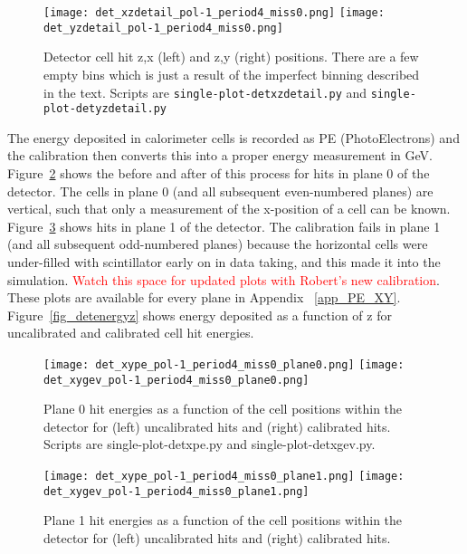  \begin{figure}	   
 \centering
  \texttt{[image: det\_xzdetail\_pol-1\_period4\_miss0.png]}
   \texttt{[image: det\_yzdetail\_pol-1\_period4\_miss0.png]}
  \caption{Detector cell hit z,x (left) and z,y (right) positions. There are a few empty bins which is just a result of the imperfect binning described in the text.
  Scripts are \texttt{single-plot-detxzdetail.py} and \texttt{single-plot-detyzdetail.py}  }			
   \label{fig_detxz}
  \end{figure}
  
  

\noindent
The energy deposited in calorimeter cells is recorded as PE (PhotoElectrons) and the calibration then converts this into a proper energy measurement in GeV. Figure~\ref{fig_calibhits0} shows the before and after of this process for hits in plane 0 of the detector. The cells in plane 0 (and all subsequent even-numbered planes) are vertical, such that only a measurement of the x-position of a cell can be known. Figure~\ref{fig_calibhits1} shows hits in plane 1 of the detector.  The calibration fails in plane 1 (and all subsequent odd-numbered planes) because the horizontal cells were under-filled with scintillator early on in data taking, and this made it into the simulation. \textcolor{red}{Watch this space for updated plots with Robert's new calibration}.  These plots are available for every plane in Appendix ~\ref{app_PE_XY}.  Figure~\ref{fig_detenergyz} shows energy deposited as a function of z for uncalibrated and calibrated cell hit energies. 


 \begin{figure}	   
 \centering
  \texttt{[image: det\_xype\_pol-1\_period4\_miss0\_plane0.png]}
   \texttt{[image: det\_xygev\_pol-1\_period4\_miss0\_plane0.png]}
  \caption{Plane 0 hit energies as a function of the cell positions within the detector for (left) uncalibrated hits and (right) calibrated hits. Scripts are single-plot-detxpe.py and single-plot-detxgev.py.}			
   \label{fig_calibhits0}
  \end{figure}
%
%  
% 
% 
  \begin{figure}	   
 \centering
  \texttt{[image: det\_xype\_pol-1\_period4\_miss0\_plane1.png]}
   \texttt{[image: det\_xygev\_pol-1\_period4\_miss0\_plane1.png]}
  \caption{Plane 1 hit energies as a function of the cell positions within the detector for (left) uncalibrated hits and (right) calibrated hits.}			
   \label{fig_calibhits1}
  \end{figure}



